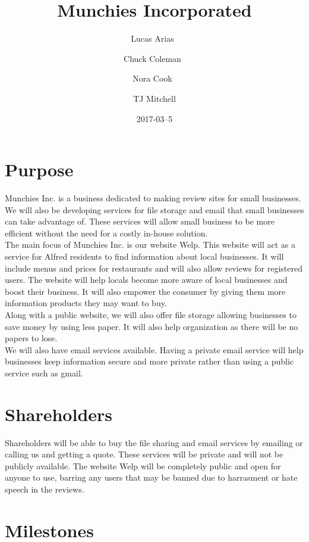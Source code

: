 \documentclass[12pt]{article}
\title{Munchies Incorporated}
\date{2017-03--5}
\author{Lucas Arias\
        \and
        Chuck Coleman\
        \and
        Nora Cook\
        \and
        TJ Mitchell
        }
\begin{document}
        \maketitle
        \newpage
\section{Purpose}
        \indent Munchies Inc. is a business dedicated to making review sites for 
        small businesses. We will also be developing services for file storage and
        email that small businesses can take advantage of. These services will 
        allow small business to be more efficient without the need for a costly 
        in-house solution.\\

        The main focus of Munchies Inc. is our website Welp. This website 
        will act as a service for Alfred residents to find information about local 
        businesses. It will include menus and prices for restaurants and will 
        also allow reviews for registered users. The website will help locals 
        become more aware of local businesses and boost their business. It will 
        also empower the consumer by giving them more information products they
        may want to buy.\\

        Along with a public website, we will also offer file storage 
        allowing businesses to save money by using less paper. It will also help 
        organization as there will be no papers to lose.\\

        We will also have email services available. Having a private email 
        service will help businesses keep information secure and more private 
        rather than using a public service such as gmail.\\

\section{Shareholders}
        Shareholders will be able to buy the file sharing and email services by
        emailing or calling us and getting a quote. These services will be private
        and will not be publicly available. The website Welp will be completely
        public and open for anyone to use, barring any users that may be banned
        due to harrasment or hate speech in the reviews. 

\section{Milestones}
\end{document}

